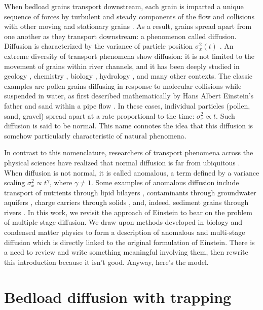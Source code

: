 \documentclass[]{agujournal2018}
\begin{document}
When bedload grains transport downstream, each grain is imparted a unique sequence of forces by turbulent and steady components of the flow \citep{} and collisions with other moving and stationary grains \citep{Gordon1972}. 
As a result, grains spread apart from one another as they transport downstream: a phenomenon called diffusion.
Diffusion is characterized by the variance of particle position $\sigma_x^2(t)$ \citep{Furbish2017}.
An extreme diversity of transport phenomena show diffusion: it is not limited to the movement of grains within river channels, and it has been deeply studied in geology \citep{Berkowitz2006}, chemistry \citep{Shugard1976}, biology \citep{Sokolov2012}, hydrology \citep{Yang2019}, and many other contexts.
The classic examples are pollen grains diffusing in response to molecular collisions while suspended in water, as first described mathematically by Hans Albert Einstein's father \citep{Einstein1905} and sand within a pipe flow \citep{Taylor1920}.
In these cases, individual particles (pollen, sand, gravel) spread apart at a rate proportional to the time: $\sigma_x^2 \propto t$. Such diffusion is said to be normal.
This name connotes the idea that this diffusion is somehow particularly characteristic of natural phenomena.

In contrast to this nomenclature, researchers of transport phenomena across the physical sciences have realized that normal diffusion is far from ubiquitous \citep{Shlesinger1993}.
When diffusion is not normal, it is called anomalous, a term defined by a variance scaling $\sigma_x^2 \propto t^\gamma$, where $\gamma \neq 1$. 
Some examples of anomalous diffusion include transport of nutrients through lipid bilayers \citep[e.g.][]{Jeon2012,Molina-Garcia2018}, contaminants through groundwater aquifers \citep[e.g.][]{AaraoReis2014,Yang2019}, charge carriers through solids \citep[e.g.][]{Scher1973}, and, indeed, sediment grains through rivers \citep{Hassan2017,Phillips2013,Martin2012,Bradley2017}.
In this work, we revisit the approach of Einstein to bear on the problem of multiple-stage diffusion.
We draw upon methods developed in biology and condensed matter physics to form a description of anomalous and multi-stage diffusion which is directly linked to the original formulation of Einstein.
There is a need to review \citet{Wu2019, Zhang2012, Hassan2017, Phillips2013, Martin2012} and write something meaningful involving them, then rewrite this introduction because it isn't good.
Anyway, here's the model.


\section{Bedload diffusion with trapping}
\end{document}
